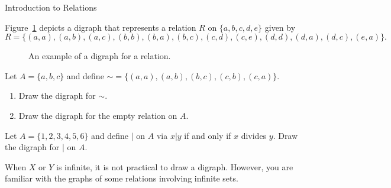 \begin{section}{Introduction to Relations}
\begin{example}\label{ex:digraph}
Figure~\ref{fig:digraph} depicts a digraph that represents a relation $R$ on $\{a,b,c,d,e\}$ given by
\[
R=\{(a,a),(a,b),(a,c),(b,b),(b,a),(b,c),(c,d),(c,e),(d,d),(d,a),(d,c),(e,a)\}.
\]

\begin{figure}[h!]
\begin{center}
\caption{An example of a digraph for a relation.}\label{fig:digraph}
\end{center}
\end{figure}

\end{example}

\begin{problem}
Let $A=\{a,b,c\}$ and define ${\sim}=\{(a,a),(a,b),(b,c),(c,b),(c,a)\}$.  
\begin{enumerate}[label=\textrm{(\alph*)}]
\item Draw the digraph for $\sim$.
\item Draw the digraph for the empty relation on $A$.
\end{enumerate}
\end{problem}

\begin{problem}
Let $A=\{1,2,3,4,5,6\}$ and define $|$ on $A$ via $x|y$ if and only if $x$ divides $y$.  Draw the digraph for $|$ on $A$.
\end{problem}

When $X$ or $Y$ is infinite, it is not practical to draw a digraph.  However, you are familiar with the graphs of some relations involving infinite sets.


\end{section}
